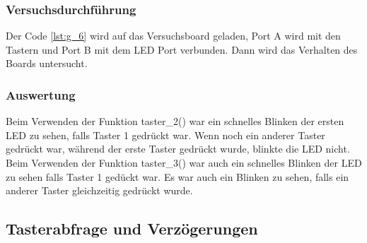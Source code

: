 \documentclass[12pt,a4paper]{article}
\begin{document}
\subsubsection*{Versuchsdurchführung}

Der Code \ref{lst:g_6} wird auf das Versuchsboard geladen, Port A wird mit den Tastern und Port B mit dem LED Port verbunden. Dann wird das Verhalten des Boards untersucht.

\subsubsection*{Auswertung}

Beim Verwenden der Funktion taster\_2() war ein schnelles Blinken der ersten LED zu sehen, falls Taster 1 gedrückt war. Wenn noch ein anderer Taster gedrückt war, während der erste Taster gedrückt wurde, blinkte die LED nicht. Beim Verwenden der Funktion taster\_3() war auch ein schnelles Blinken der LED zu sehen falls Taster 1 gedückt war. Es war auch ein Blinken zu sehen, falls ein anderer Taster gleichzeitig gedrückt wurde.

\subsection{Tasterabfrage und Verzögerungen}
\end{document}
